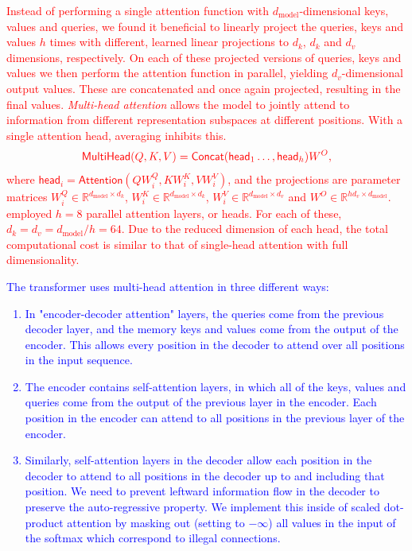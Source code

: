 \documentclass{article}
\begin{document}
	\textcolor{red}{
	Instead of performing a single attention function with $d_\text{model}$-dimensional keys, values 
	and queries, we found it beneficial to linearly project the queries, keys and values $h$ times with 
	different, learned linear projections to $d_k$, $d_k$ and $d_v$ dimensions, respectively. On each of 
	these projected versions of queries, keys and values we then perform the attention function in 
	parallel, yielding $d_v$-dimensional output values. 
	These are concatenated and once again projected, resulting in the final values.
	\textit{Multi-head attention} allows the model to jointly attend to information from different 
	representation subspaces at different positions. With a single attention head, averaging inhibits 
	this.}
	\begin{equation}
		\label{eqn:multihead}
		\color{red}{\mathsf{MultiHead}(Q, K, V) = \mathsf{Concat}(\mathsf{head}_1 \dots, 
		\mathsf{head}_h) W^O }
		\mbox{,}
	\end{equation}
	\textcolor{red}{
	where $ \mathsf{head}_i = \mathsf{Attention}(QW_i^Q, KW_i^K , VW_i^V)$, and the 
	projections are parameter matrices $W_i^Q \in \mathbb{R}^{d_{\text{model}}\times 
	d_k}$, %
	$W_i^K \in \mathbb{R}^{d_{\text{model}}\times d_k}$, $W_i^V \in 
	\mathbb{R}^{d_{\text{model}}\times d_v}$ and $W^O \in \mathbb{R}^{hd_v \times 
	d_{\text{model}}}$.
	\citet{vaswani2017attention} employed $h = 8$ parallel attention layers, or heads. For each of these, 
	$d_k = d_v = d_\text{model}/h = 64$. Due to the reduced dimension of each head, the total 
	computational cost is similar to that of single-head attention with full dimensionality.}
	
	\textcolor{blue}{
	The transformer uses multi-head attention in three different ways:
	\begin{enumerate}
		\item In "encoder-decoder attention" layers, the queries come from the previous decoder layer, 
		and the memory keys and values come from the output of the encoder. This allows every position 
		in the decoder to attend over all positions in the input sequence.
		\item The encoder contains self-attention layers, in which all of the keys, values 
		and queries come from the output of the previous layer in the encoder. 
		Each position in the encoder can attend to all positions in the previous layer of the encoder.
		\item Similarly, self-attention layers in the decoder allow each position in the decoder to attend to 
		all positions in the decoder up to and including that position. We need to prevent leftward 
		information flow in the decoder to preserve the auto-regressive property. We implement this 
		inside of scaled dot-product attention by masking out (setting to $-\infty$) all values in the input 
		of the softmax which correspond to illegal connections. 
	\end{enumerate}
	}
	
\end{document}
